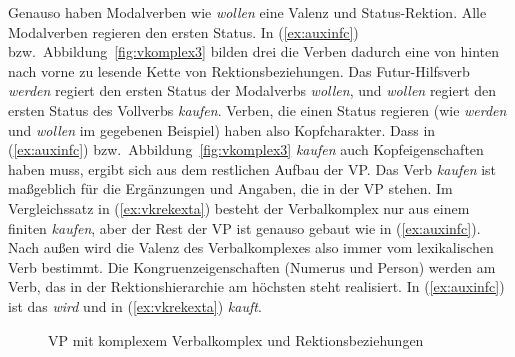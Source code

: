 Genauso haben Modalverben wie \textit{wollen} eine Valenz und Status-Rektion.
Alle Modalverben regieren den ersten Status.
In (\ref{ex:auxinfc}) bzw.\ Abbildung~\ref{fig:vkomplex3} bilden drei die Verben dadurch eine von hinten nach vorne zu lesende Kette von Rektionsbeziehungen.
Das Futur-Hilfsverb \textit{werden} regiert den ersten Status der Modalverbs \textit{wollen}, und \textit{wollen} regiert den ersten Status des Vollverbs \textit{kaufen}.
Verben, die einen Status regieren (wie \textit{werden} und \textit{wollen} im gegebenen Beispiel) haben also Kopfcharakter.
Dass in (\ref{ex:auxinfc}) bzw.\ Abbildung~\ref{fig:vkomplex3} \textit{kaufen} auch Kopfeigenschaften haben muss, ergibt sich aus dem restlichen Aufbau der VP.
Das Verb \textit{kaufen} ist maßgeblich für die Ergänzungen und Angaben, die in der VP stehen.
Im Vergleichssatz in (\ref{ex:vkrekexta}) besteht der Verbalkomplex nur aus einem finiten \textit{kaufen}, aber der Rest der VP ist genauso gebaut wie in (\ref{ex:auxinfc}).
Nach außen wird die Valenz des Verbalkomplexes also immer vom lexikalischen Verb bestimmt.
Die Kongruenzeigenschaften (Numerus und Person) werden am Verb, das in der Rektionshierarchie am höchsten steht realisiert.
In (\ref{ex:auxinfc}) ist das \textit{wird} und in (\ref{ex:vkrekexta}) \textit{kauft}.

\begin{exe}
\end{exe}

\begin{figure}
  \centering
  \caption{VP mit komplexem Verbalkomplex und Rektionsbeziehungen}
  \label{fig:vkrekext}
\end{figure}

